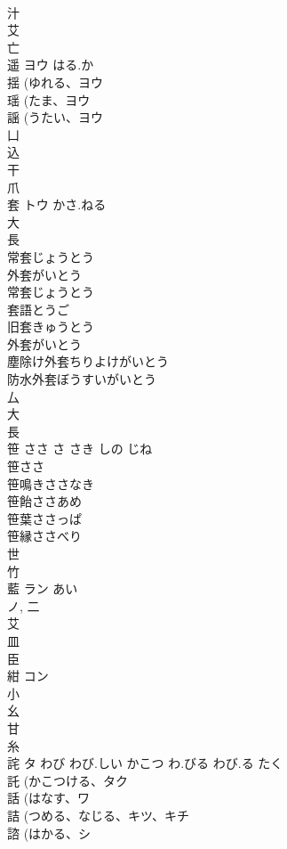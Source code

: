 \documentclass[8pt]{extreport}
\begin{document}
\begin{CJK}{UTF8}{min}
\\	汁 
\\	艾 
\\	亡 
\\	遥	ヨウ	はる.か	
\\	揺 (ゆれる、ヨウ 
\\	瑶 (たま、ヨウ 
\\	謡 (うたい、ヨウ 
\\	凵 
\\	込 
\\	干 
\\	爪 
\\	套	トウ	かさ.ねる	
\\	大 
\\	長 
\\	常套じょうとう 
\\	外套がいとう 
\\	常套じょうとう 
\\	套語とうご 
\\	旧套きゅうとう 
\\	外套がいとう 
\\	塵除け外套ちりよけがいとう 
\\	防水外套ぼうすいがいとう 
\\	厶 
\\	大 
\\	長 
\\	笹		ささ さ さき しの じね	
\\	笹ささ 
\\	笹鳴きささなき 
\\	笹飴ささあめ 
\\	笹葉ささっぱ 
\\	笹縁ささべり 
\\	世 
\\	竹 
\\	藍	ラン	あい	
\\	ノ, 二 
\\	艾 
\\	皿 
\\	臣 
\\	紺	コン		
\\	小 
\\	幺 
\\	甘 
\\	糸 
\\	詫	タ	わび わび.しい かこつ わ.びる わび.る たく	
\\	託 (かこつける、タク 
\\	話 (はなす、ワ 
\\	詰 (つめる、なじる、キツ、キチ 
\\	諮 (はかる、シ 

\end{CJK}
\end{document}
